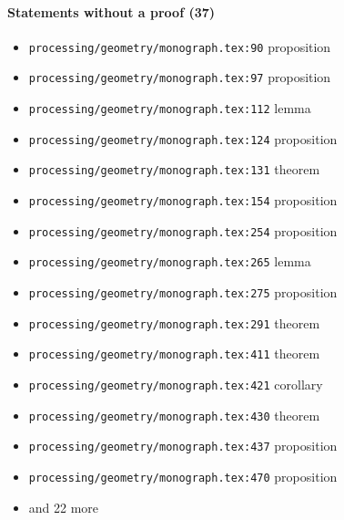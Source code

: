 \documentclass[11pt]{article}
\newcommand{\loc}[1]{{\small\color{muted}\texttt{#1}}}
\begin{document}
\paragraph{Statements without a proof (37)}
\begin{itemize}
\item \loc{processing/\allowbreak{}geometry/\allowbreak{}monograph.tex:90} proposition
\item \loc{processing/\allowbreak{}geometry/\allowbreak{}monograph.tex:97} proposition
\item \loc{processing/\allowbreak{}geometry/\allowbreak{}monograph.tex:112} lemma
\item \loc{processing/\allowbreak{}geometry/\allowbreak{}monograph.tex:124} proposition
\item \loc{processing/\allowbreak{}geometry/\allowbreak{}monograph.tex:131} theorem
\item \loc{processing/\allowbreak{}geometry/\allowbreak{}monograph.tex:154} proposition
\item \loc{processing/\allowbreak{}geometry/\allowbreak{}monograph.tex:254} proposition
\item \loc{processing/\allowbreak{}geometry/\allowbreak{}monograph.tex:265} lemma
\item \loc{processing/\allowbreak{}geometry/\allowbreak{}monograph.tex:275} proposition
\item \loc{processing/\allowbreak{}geometry/\allowbreak{}monograph.tex:291} theorem
\item \loc{processing/\allowbreak{}geometry/\allowbreak{}monograph.tex:411} theorem
\item \loc{processing/\allowbreak{}geometry/\allowbreak{}monograph.tex:421} corollary
\item \loc{processing/\allowbreak{}geometry/\allowbreak{}monograph.tex:430} theorem
\item \loc{processing/\allowbreak{}geometry/\allowbreak{}monograph.tex:437} proposition
\item \loc{processing/\allowbreak{}geometry/\allowbreak{}monograph.tex:470} proposition
\item[] {\color{muted}\small and 22 more}
\end{itemize}
\end{document}
